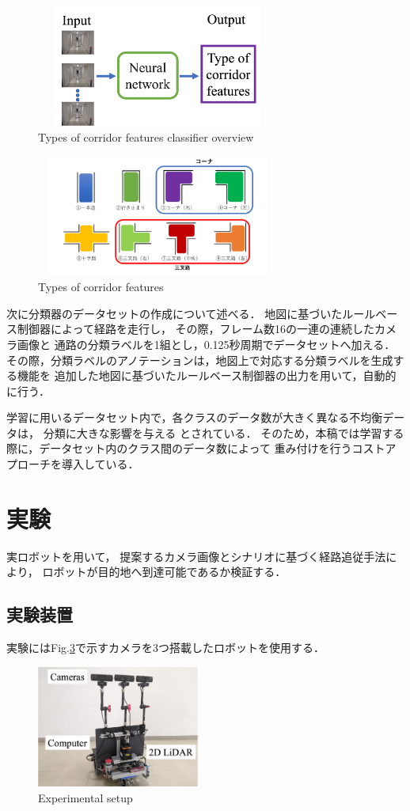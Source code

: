 \documentclass{sice-si}
\begin{document}
\begin{figure}[h!]
    \centering
     \includegraphics[height=40mm,width=80mm]{./figs/LRCN_gai.png}
     \caption{Types of corridor features classifier overview}\label{fig:lrcn}
\end{figure}
\begin{figure}[h!]
    \centering
     \includegraphics[height=40mm,width=80mm]{./figs/type.png}
     \caption{Types of corridor features}\label{fig:intersection}
\end{figure}
\par
次に分類器のデータセットの作成について述べる．
地図に基づいたルールベース制御器によって経路を走行し，
その際，フレーム数16の一連の連続したカメラ画像と
通路の分類ラベルを1組とし，0.125秒周期でデータセットへ加える．
その際，分類ラベルのアノテーションは，地図上で対応する分類ラベルを生成する機能を
追加した地図に基づいたルールベース制御器の出力を用いて，自動的に行う．
\par
学習に用いるデータセット内で，各クラスのデータ数が大きく異なる不均衡データは，
分類に大きな影響を与える
\cite{hukin}
とされている．
そのため，本稿では学習する際に，データセット内のクラス間のデータ数によって
重み付けを行うコストアプローチ\cite{cost}を導入している．

\section{実験}
実ロボットを用いて，
提案するカメラ画像とシナリオに基づく経路追従手法により，
ロボットが目的地へ到達可能であるか検証する．

\subsection{実験装置}
実験にはFig.\ref{fig:gamma}で示すカメラを3つ搭載したロボットを使用する．
\begin{figure}[htbp]
    \centering
     \includegraphics[height=40mm]{./figs/gamma_sensor.png}
     \caption{Experimental setup}\label{fig:gamma}
\end{figure}
\end{document}
